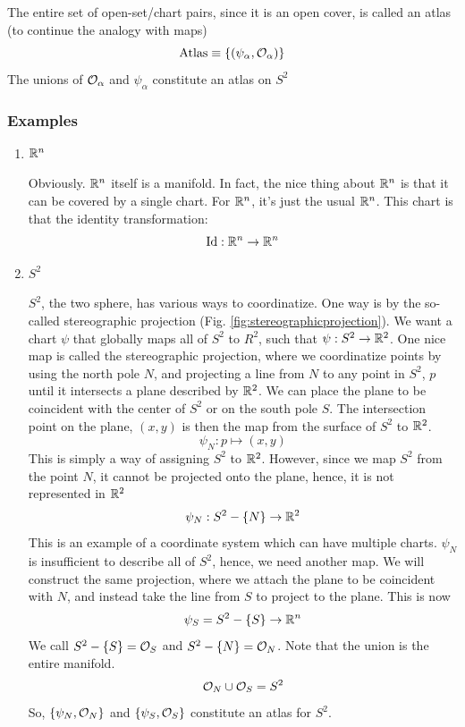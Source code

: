 		The entire set of open-set/chart pairs, since it is an open cover, is called an atlas (to continue the analogy with maps)
		\[
			\text{Atlas} \equiv \qty{(\psi_\alpha,\mathcal O_\alpha)}
		\]
		The unions of $\mathcal O_\alpha$ and $\psi_\alpha$ constitute an atlas on $S^2$

	\subsubsection{Examples}
		\begin{enumerate}[(1)]
			\item $\mathbb{R}^n$
				
				Obviously. $\mathbb{R}^n$ itself is a manifold. In fact, the nice thing about $\mathbb{R}^n$ is that it can be covered by a single chart. For $\mathbb{R}^n$, it's just the usual $\mathbb{R}^n$.
				This chart is that the identity transformation:
				\[
					\text{Id}: \mathbb{R}^n \to\mathbb{R}^n
				\]
			\item $S^2$

				$S^2$, the two sphere, has various ways to coordinatize. One way is by the so-called stereographic projection (Fig. \ref{fig:stereographicprojection}).
				We want a chart $\psi$ that globally maps all of $S^2$ to $R^2$, such that $\psi:S^2\to\mathbb{R}^2$. One nice map is called the stereographic projection, where we coordinatize 
				points by using the north pole $N$, and projecting a line from $N$ to any point in $S^2$, $p$ until it intersects a plane described by $\mathbb{R}^2$. 
				We can place the plane to be coincident with the center of $S^2$ or on the south pole $S$. The intersection point on the plane, $(x,y)$ is then the map from the surface of $S^2$ to $\mathbb{R}^2$.
				\[
					\psi_N:p\mapsto(x,y)
				\]
				This is simply a way of assigning $S^2$ to $\mathbb{R}^2$. However, since we map $S^2$ from  the point $N$, it cannot be 
				projected onto the plane, hence, it is not represented in $\mathbb{R}^2$
				\[
					\psi_N: S^2-\{N\} \to \mathbb{R}^2
				\]
				This is an example of a coordinate system which can have multiple charts. $\psi_N$ is insufficient to describe all of 
				$S^2$, hence, we need another map. We will construct the same projection, where we attach the plane to be coincident with $N$, 
				and instead take the line from $S$ to project to the plane. This is now
				\[
					\psi_S = S^2 - \{S\} \to \mathbb{R}^n 
				\]
				We call $S^2 - \{S\}=\mathcal O_S$ and $S^2 - \{N\}=\mathcal O_N$. Note that the union is the entire manifold.
				\[
					\mathcal O_N \cup \mathcal O_S = S^2
				\]
				So, $\qty{\psi_N,\mathcal O_N}$ and $\qty{\psi_S,\mathcal O_S}$ constitute an atlas for $S^2$.


\end{enumerate}
